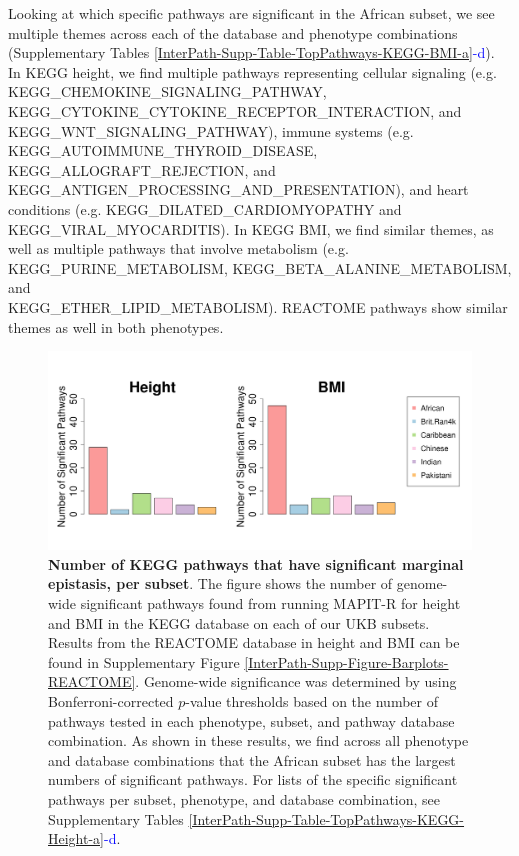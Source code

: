 \documentclass[12pt,a4paper]{article}
\begin{document}
Looking at which specific pathways are significant in the African subset, we see multiple themes across each of the database and phenotype combinations (Supplementary Tables \ref{InterPath-Supp-Table-TopPathways-KEGG-BMI-a}\textcolor{blue}{-d}). In KEGG height, we find multiple pathways representing cellular signaling (e.g. KEGG\_CHEMOKINE\_SIGNALING\_PATHWAY, KEGG\_CYTOKINE\_CYTOKINE\_RECEPTOR\_INTERACTION, and \\ KEGG\_WNT\_SIGNALING\_PATHWAY), immune systems (e.g. \\ KEGG\_AUTOIMMUNE\_THYROID\_DISEASE, KEGG\_ALLOGRAFT\_REJECTION, and KEGG\_ANTIGEN\_PROCESSING\_AND\_PRESENTATION), and heart conditions (e.g. KEGG\_DILATED\_CARDIOMYOPATHY and \\ KEGG\_VIRAL\_MYOCARDITIS). In KEGG BMI, we find similar themes, as well as multiple pathways that involve metabolism (e.g. KEGG\_PURINE\_METABOLISM, KEGG\_BETA\_ALANINE\_METABOLISM, and \\ KEGG\_ETHER\_LIPID\_METABOLISM). REACTOME pathways show similar themes as well in both phenotypes.

\begin{figure}[htb]
\centering
\hspace*{-.9cm}
\includegraphics[scale=.45]{Images/Main/InterPath_Main_Figure_Barplots_KEGG_vs2.png}
\caption[TBD]{\textbf{Number of KEGG pathways that have significant marginal epistasis, per subset}. The figure shows the number of genome-wide significant pathways found from running MAPIT-R for height and BMI in the KEGG database on each of our UKB subsets. Results from the REACTOME database in height and BMI can be found in Supplementary Figure \ref{InterPath-Supp-Figure-Barplots-REACTOME}. Genome-wide significance was determined by using Bonferroni-corrected $p$-value thresholds based on the number of pathways tested in each phenotype, subset, and pathway database combination. As shown in these results, we find across all phenotype and database combinations that the African subset has the largest numbers of significant pathways. For lists of the specific significant pathways per subset, phenotype, and database combination, see Supplementary Tables \ref{InterPath-Supp-Table-TopPathways-KEGG-Height-a}\textcolor{blue}{-d}.}
\label{InterPath-Main-Figure-Barplots-KEGG}
\end{figure}
\end{document}
